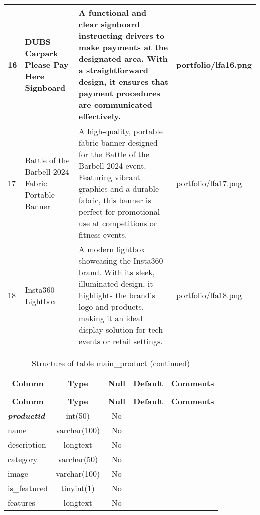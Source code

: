 \begin{longtable}{|l|l|l|l|}
16 & DUBS Carpark Please Pay Here Signboard & A functional and clear signboard instructing drivers to make payments at the designated area. With a straightforward design, it ensures that payment procedures are communicated effectively. & portfolio/lfa16.png \\ \hline 
17 & Battle of the Barbell 2024 Fabric Portable Banner & A high-quality, portable fabric banner designed for the Battle of the Barbell 2024 event. Featuring vibrant graphics and a durable fabric, this banner is perfect for promotional use at competitions or fitness events. & portfolio/lfa17.png \\ \hline 
18 & Insta360 Lightbox & A modern lightbox showcasing the Insta360 brand. With its sleek, illuminated design, it highlights the brand’s logo and products, making it an ideal display solution for tech events or retail settings. & portfolio/lfa18.png \\ \hline 
 \end{longtable}

%
%
 \begin{longtable}{|l|c|c|c|l|} 
 \caption{Structure of table main\_product} \label{tab:main_product-structure} \\
 \hline \multicolumn{1}{|c|}{\textbf{Column}} & \multicolumn{1}{|c|}{\textbf{Type}} & \multicolumn{1}{|c|}{\textbf{Null}} & \multicolumn{1}{|c|}{\textbf{Default}} & \multicolumn{1}{|c|}{\textbf{Comments}} \\ \hline \hline
\endfirsthead
 \caption{Structure of table main\_product (continued)} \\ 
 \hline \multicolumn{1}{|c|}{\textbf{Column}} & \multicolumn{1}{|c|}{\textbf{Type}} & \multicolumn{1}{|c|}{\textbf{Null}} & \multicolumn{1}{|c|}{\textbf{Default}} & \multicolumn{1}{|c|}{\textbf{Comments}} \\ \hline \hline \endhead \endfoot 
\textbf{\textit{productid}} & int(50) & No &  \\ \hline 
name & varchar(100) & No &  \\ \hline 
description & longtext & No &  \\ \hline 
category & varchar(50) & No &  \\ \hline 
image & varchar(100) & No &  \\ \hline 
is\_featured & tinyint(1) & No &  \\ \hline 
features & longtext & No &  \\ \hline 
 \end{longtable}

